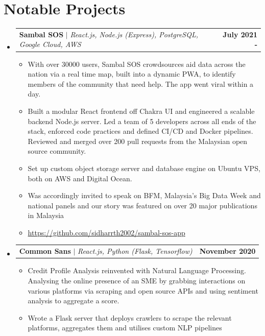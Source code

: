 \documentclass[letterpaper,12pt]{article}
\makeatletter
\newcommand{\resumeItem}[1]{
  \item\small{
    {#1 \vspace{-2pt}}
  }
}
\newcommand{\resumeProjectHeading}[2]{
    \item
    \begin{tabular*}{1.001\textwidth}{l@{\extracolsep{\fill}}r}
      \small#1 & \textbf{\small #2}\\
    \end{tabular*}\vspace{-7pt}
}
\newcommand{\resumeSubHeadingListStart}{\begin{itemize}[leftmargin=0.0in, label={}]}
\newcommand{\resumeSubHeadingListEnd}{\end{itemize}}
\newcommand{\resumeItemListStart}{\begin{itemize}}
\newcommand{\resumeItemListEnd}{\end{itemize}\vspace{-5pt}}
\makeatother
\begin{document}
\section{Notable Projects}
    \vspace{-5pt}
    \resumeSubHeadingListStart
      \resumeProjectHeading
          {\textbf{Sambal SOS} $|$ \emph{React.js, Node.js (Express), PostgreSQL, Google Cloud, AWS}}{July 2021 - }
          \resumeItemListStart
            \resumeItem{With over 30000 users, Sambal SOS crowdsources aid data across the nation via a real time map, built into a dynamic PWA, to identify members of the community that need help. The app went viral within a day.}
            \resumeItem{Built a modular React frontend off Chakra UI and engineered a scalable backend Node.js server. Led a team of 5 developers across all ends of the stack, enforced code practices and defined CI/CD and Docker pipelines. Reviewed and merged over 200 pull requests from the Malaysian open source community.}
            \resumeItem{Set up custom object storage server and database engine on Ubuntu VPS, both on AWS and Digital Ocean.}
            \resumeItem{Was accordingly invited to speak on BFM, Malaysia's Big Data Week and national panels and our story was featured on over 20 major publications in Malaysia}
            \resumeItem{\url{https://github.com/sidharrth2002/sambal-sos-app}}
          \resumeItemListEnd
          \vspace{-13pt}
      \resumeProjectHeading
          {\textbf{Common Sans} $|$ \emph{React.js, Python (Flask, Tensorflow)}}{November 2020}
          \resumeItemListStart
            \resumeItem{Credit Profile Analysis reinvented with Natural Language Processing. Analysing the online presence of an SME by grabbing interactions on various platforms via scraping and open source APIs and using sentiment analysis to aggregate a score.}
            \resumeItem{Wrote a Flask server that deploys crawlers to scrape the relevant platforms, aggregates them and utilises custom NLP pipelines}
            \resumeItemListEnd
          \vspace{-1pt}
    \resumeSubHeadingListEnd
\vspace{-15pt}

\end{document}
